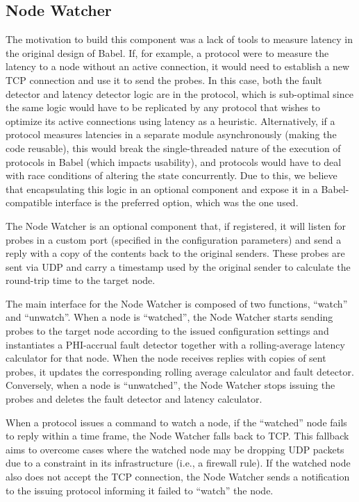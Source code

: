 \subsection{Node Watcher} \label{sec:Node-Watcher}

The motivation to build this component was a lack of tools to measure latency in the original design of Babel. If, for example, a protocol were to measure the latency to a node without an active connection, it would need to establish a new TCP connection and use it to send the probes. In this case, both the fault detector and latency detector logic are in the protocol, which is sub-optimal since the same logic would have to be replicated by any protocol that wishes to optimize its active connections using latency as a heuristic. Alternatively, if a protocol measures latencies in a separate module asynchronously (making the code reusable), this would break the single-threaded nature of the execution of protocols in Babel (which impacts usability), and protocols would have to deal with race conditions of altering the state concurrently. Due to this, we believe that encapsulating this logic in an optional component and expose it in a Babel-compatible interface is the preferred option, which was the one used.

The Node Watcher is an optional component that, if registered, it will listen for probes in a custom port (specified in the configuration parameters) and send a reply with a copy of the contents back to the original senders. These probes are sent via UDP and carry a timestamp used by the original sender to calculate the round-trip time to the target node.

The main interface for the Node Watcher is composed of two functions, ``watch'' and ``unwatch''. When a node is ``watched'', the Node Watcher starts sending probes to the target node according to the issued configuration settings and instantiates a PHI-accrual fault detector \cite{phi-accrual-fd} together with a rolling-average latency calculator for that node.  When the node receives replies with copies of sent probes, it updates the corresponding rolling average calculator and fault detector. Conversely, when a node is ``unwatched'', the Node Watcher stops issuing the probes and deletes the fault detector and latency calculator.

When a protocol issues a command to watch a node, if the ``watched'' node fails to reply within a time frame, the Node Watcher falls back to TCP. This fallback aims to overcome cases where the watched node may be dropping UDP packets due to a constraint in its infrastructure (i.e., a firewall rule). If the watched node also does not accept the TCP connection, the Node Watcher sends a notification to the issuing protocol informing it failed to ``watch'' the node.

